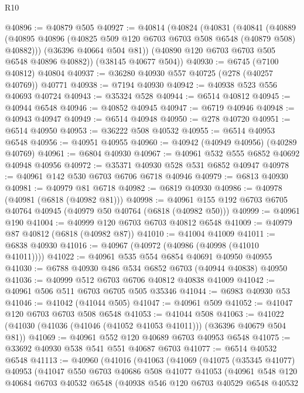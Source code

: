 \begin{lexlean}{R10}
\begin{coremodule}
@40896 := @40879 @505
@40927 := @40814
    (@40824
      (@40831
        (@40841
          (@40889 (@40895 @40896 (@40825 @509 @120 @6703 @6703 @508 @6548 (@40879 @508) @40882)))
          (@36396 @40664 @504 @81))
        (@40890 @120 @6703 @6703 @505 @6548 @40896 @40882))
      (@38145 @40677 @504))
@40930 := @6745 (@7100 @40812) @40804
@40937 := @36280 @40930 @557 @40725 (@278 (@40257 @40769)) @40771
@40938 := @7194 @40930
@40942 := @40938 @523 @556 @40693 @40724
@40943 := @35324 @528
@40944 := @6514 @40812
@40945 := @40944 @6548
@40946 := @40852 @40945
@40947 := @6719 @40946
@40948 := @40943 @40947
@40949 := @6514 @40948
@40950 := @278 @40720
@40951 := @6514 @40950
@40953 := @36222 @508 @40532
@40955 := @6514 @40953 @6548
@40956 := @40951 @40955
@40960 := @40942 (@40949 @40956) (@40289 @40769)
@40961 := @6804 @40930
@40967 := @40961 @532 @555 @6852 @40692 @40948 @40956
@40972 := @35371 @40930 @528 @531 @6852 @40947
@40978 := @40961 @142 @530 @6703 @6706 @6718 @40946
@40979 := @6813 @40930
@40981 := @40979 @81 @6718
@40982 := @6819 @40930
@40986 := @40978 (@40981 (@6818 (@40982 @81)))
@40998 := @40961 @155 @192 @6703 @6705 @40764 @40945 (@40979 @50 @40764 (@6818 (@40982 @50)))
@40999 := @40961 @190
@41004 := @40999 @120 @6703 @6703 @40812 @6548
@41009 := @40979 @87 @40812 (@6818 (@40982 @87))
@41010 := @41004 @41009
@41011 := @6838 @40930
@41016 := @40967 (@40972 (@40986 (@40998 (@41010 @41011))))
@41022 := @40961 @535 @554 @6854 @40691 @40950 @40955
@41030 := @6788 @40930 @486 @534 @6852 @6703 (@40944 @40838) @40950
@41036 := @40999 @512 @6703 @6706 @40812 @40838 @41009
@41042 := @40961 @506 @511 @6703 @6705 @505 @35346
@41044 := @6983 @40930 @53
@41046 := @41042 (@41044 @505)
@41047 := @40961 @509
@41052 := @41047 @120 @6703 @6703 @508 @6548
@41053 := @41044 @508
@41063 := @41022 (@41030 (@41036 (@41046 (@41052 @41053 @41011))) (@36396 @40679 @504 @81))
@41069 := @40961 @552 @120 @40689 @6703 @40953 @6548
@41075 := @33692 @40930 @538 @541 @551 @40687 @6703
@41077 := @6514 @40532 @6548
@41113 := @40960
    (@41016
      (@41063
        (@41069
          (@41075
            (@35345 @41077)
            @40953
            (@41047
              @550
              @6703
              @40686
              @508
              @41077
              @41053
              (@40961
                @548
                @120
                @40684
                @6703
                @40532
                @6548
                (@40938
                  @546
                  @120
                  @6703
                  @40529
                  @6548
                  @40532

\end{coremodule}
\end{lexlean}
